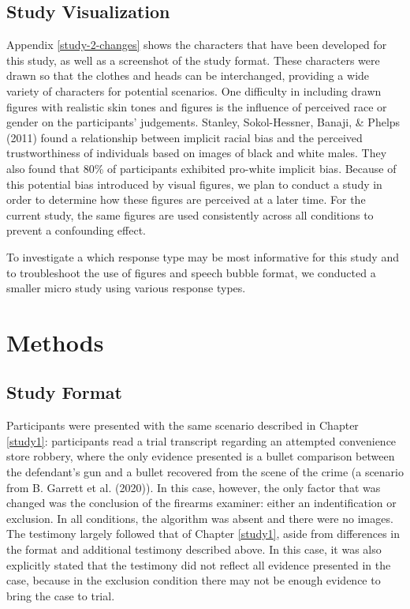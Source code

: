 \documentclass[print]{nuthesis}
\begin{document}
\hypertarget{study-visualization}{%
\subsection{Study Visualization}\label{study-visualization}}

Appendix \ref{study-2-changes} shows the characters that have been developed for this study, as well as a screenshot of the study format.
These characters were drawn so that the clothes and heads can be interchanged, providing a wide variety of characters for potential scenarios.
One difficulty in including drawn figures with realistic skin tones and figures is the influence of perceived race or gender on the participants' judgements.
Stanley, Sokol-Hessner, Banaji, \& Phelps (2011) found a relationship between implicit racial bias and the perceived trustworthiness of individuals based on images of black and white males.
They also found that 80\% of participants exhibited pro-white implicit bias.
Because of this potential bias introduced by visual figures, we plan to conduct a study in order to determine how these figures are perceived at a later time.
For the current study, the same figures are used consistently across all conditions to prevent a confounding effect.

To investigate a which response type may be most informative for this study and to troubleshoot the use of figures and speech bubble format, we conducted a smaller micro study using various response types.

\hypertarget{methods-2}{%
\section{Methods}\label{methods-2}}

\hypertarget{study-format-1}{%
\subsection{Study Format}\label{study-format-1}}

Participants were presented with the same scenario described in Chapter \ref{study1}: participants read a trial transcript regarding an attempted convenience store robbery, where the only evidence presented is a bullet comparison between the defendant's gun and a bullet recovered from the scene of the crime (a scenario from B. Garrett et al. (2020)).
In this case, however, the only factor that was changed was the conclusion of the firearms examiner: either an indentification or exclusion.
In all conditions, the algorithm was absent and there were no images.
The testimony largely followed that of Chapter \ref{study1}, aside from differences in the format and additional testimony described above.
In this case, it was also explicitly stated that the testimony did not reflect all evidence presented in the case, because in the exclusion condition there may not be enough evidence to bring the case to trial.
\end{document}
